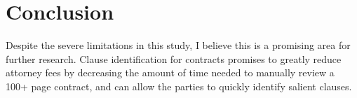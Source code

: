\section{Conclusion}

Despite the severe limitations in this study, I believe this is a promising area for further research. Clause identification for contracts promises to greatly reduce attorney fees by decreasing the amount of time needed to manually review a 100+ page contract, and can allow the parties to quickly identify salient clauses. 
